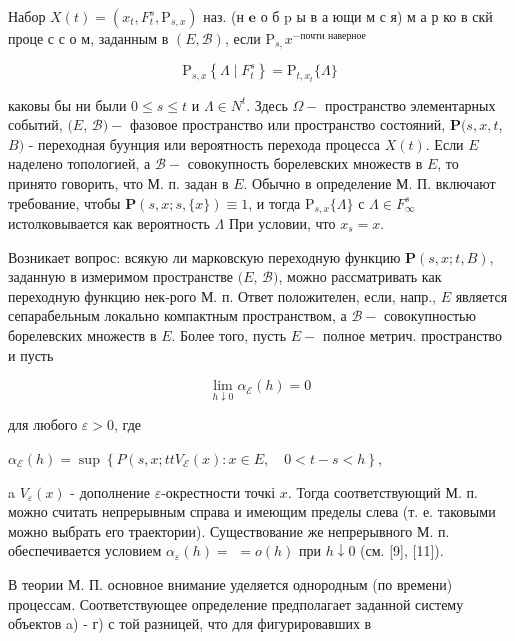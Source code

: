 \documentclass[10pt]{article}
\begin{document}
Набор $X(t)=\left(x_{t}, F_{t}^{s}, \mathrm{P}_{s, x}\right)$ наз. (н $\mathbf{e}$ о б $\mathrm{p}$ ы в а ющи м с я) м а р ко в скй проце с с о м, заданным в $(E, \mathscr{B})$, если $\mathrm{P}_{s,} x^{- \text {почти наверное }}$



\[

\mathrm{P}_{s, x}\left\{\Lambda \mid F_{t}^{s}\right\}=\mathrm{P}_{t, x_{t}}\{\Lambda\}

\]



каковы бы ни были $0 \leqslant s \leqslant t$ и $\Lambda \in N^{t}$. Здесь $\Omega-$ пространство элементарных событий, $(E$, $\mathscr{B})-$ фазовое пространство или пространство состояний, $\boldsymbol{P}(s, x, t$, $B)$ - переходная буунция или вероятность перехода процесса $X(t)$. Если $E$ наделено топологией, а $\mathscr{B}-$ совокупность борелевских множеств в $E$, то принято говорить, что М. п. задан в $E$. Обычно в определение М. П. включают требование, чтобы $\boldsymbol{P}(s, x ; s,\{x\}) \equiv 1$, и тогда $\mathrm{P}_{s, x}\{\Lambda\}$ с $\Lambda \in F_{\infty}^{s}$ истолковывается как вероятность $\Lambda$ При условии, что $x_{s}=x$.



Возникает вопрос: всякую ли марковскую переходную функцию $\boldsymbol{P}(s, x ; t, B)$, заданную в измеримом пространстве $(E$, $\mathscr{B})$, можно рассматривать как переходную функцию нек-рого М. п. Ответ положителен, если, напр., $E$ является сепарабельным локально компактным пространством, а $\mathscr{B}-$ совокупностью борелевских множеств в $E$. Более того, пусть $E-$ полное метрич. пространство и пусть



\[

\lim _{h \downarrow 0} \alpha_{\mathcal{E}}(h)=0

\]



для любого $\varepsilon>0$, где



$\alpha_{\mathcal{E}}(h)=\sup \left\{P\left(s, x ; t t V_{\mathcal{E}}(x): x \in E, \quad 0<t-s<h\right\}\right.$,



a $V_{\varepsilon}(x)$ - дополнение $\varepsilon$-окрестности точкі $x$. Тогда соответствующий М. п. можно считать непрерывным справа и имеющим пределы слева (т. е. таковыми можно выбрать его траектории). Существование же непрерывного М. п. обеспечивается условием $\alpha_{\varepsilon}(h)=$ $=o(h)$ при $h \downarrow 0$ (см. [9], [11]).



В теории М. П. основное внимание уделяется однородным (по времени) процессам. Соответствующее определение предполагает заданной систему объектов a) - г) с той разницей, что для фигурировавших в
\end{document}
